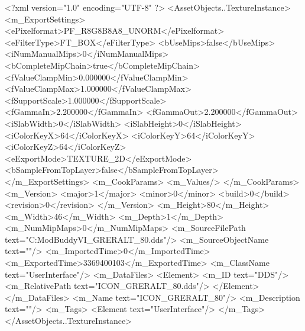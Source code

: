 <?xml version="1.0" encoding="UTF-8" ?>
<AssetObjects..TextureInstance>
	<m_ExportSettings>
		<ePixelformat>PF_R8G8B8A8_UNORM</ePixelformat>
		<eFilterType>FT_BOX</eFilterType>
		<bUseMips>false</bUseMips>
		<iNumManualMips>0</iNumManualMips>
		<bCompleteMipChain>true</bCompleteMipChain>
		<fValueClampMin>0.000000</fValueClampMin>
		<fValueClampMax>1.000000</fValueClampMax>
		<fSupportScale>1.000000</fSupportScale>
		<fGammaIn>2.200000</fGammaIn>
		<fGammaOut>2.200000</fGammaOut>
		<iSlabWidth>0</iSlabWidth>
		<iSlabHeight>0</iSlabHeight>
		<iColorKeyX>64</iColorKeyX>
		<iColorKeyY>64</iColorKeyY>
		<iColorKeyZ>64</iColorKeyZ>
		<eExportMode>TEXTURE_2D</eExportMode>
		<bSampleFromTopLayer>false</bSampleFromTopLayer>
	</m_ExportSettings>
	<m_CookParams>
		<m_Values/>
	</m_CookParams>
	<m_Version>
		<major>1</major>
		<minor>0</minor>
		<build>0</build>
		<revision>0</revision>
	</m_Version>
	<m_Height>80</m_Height>
	<m_Width>46</m_Width>
	<m_Depth>1</m_Depth>
	<m_NumMipMaps>0</m_NumMipMaps>
	<m_SourceFilePath text="C:\Users\asus\Documents\Firaxis ModBuddy\Civilization VI\temppic\ICON_GRERALT_80.dds"/>
	<m_SourceObjectName text=""/>
	<m_ImportedTime>0</m_ImportedTime>
	<m_ExportedTime>3369400103</m_ExportedTime>
	<m_ClassName text="UserInterface"/>
	<m_DataFiles>
		<Element>
			<m_ID text="DDS"/>
			<m_RelativePath text="ICON_GRERALT_80.dds"/>
		</Element>
	</m_DataFiles>
	<m_Name text="ICON_GRERALT_80"/>
	<m_Description text=""/>
	<m_Tags>
		<Element text="UserInterface"/>
	</m_Tags>
</AssetObjects..TextureInstance>

